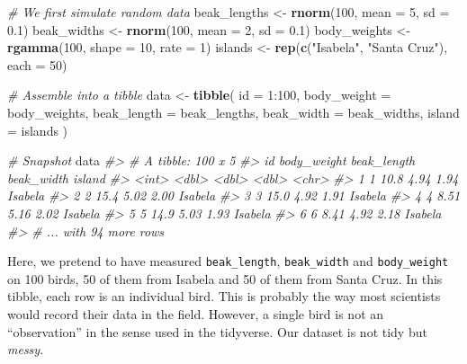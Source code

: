 \documentclass[]{book}
\newenvironment{Shaded}{}{}
\newcommand{\CommentTok}[1]{\textcolor[rgb]{0.38,0.63,0.69}{\textit{#1}}}
\newcommand{\DataTypeTok}[1]{\textcolor[rgb]{0.56,0.13,0.00}{#1}}
\newcommand{\DecValTok}[1]{\textcolor[rgb]{0.25,0.63,0.44}{#1}}
\newcommand{\FloatTok}[1]{\textcolor[rgb]{0.25,0.63,0.44}{#1}}
\newcommand{\KeywordTok}[1]{\textcolor[rgb]{0.00,0.44,0.13}{\textbf{#1}}}
\newcommand{\NormalTok}[1]{#1}
\newcommand{\OperatorTok}[1]{\textcolor[rgb]{0.40,0.40,0.40}{#1}}
\newcommand{\StringTok}[1]{\textcolor[rgb]{0.25,0.44,0.63}{#1}}
\begin{document}
\begin{Shaded}
\begin{Highlighting}[]
\CommentTok{# We first simulate random data}
\NormalTok{beak_lengths <-}\StringTok{ }\KeywordTok{rnorm}\NormalTok{(}\DecValTok{100}\NormalTok{, }\DataTypeTok{mean =} \DecValTok{5}\NormalTok{, }\DataTypeTok{sd =} \FloatTok{0.1}\NormalTok{)}
\NormalTok{beak_widths <-}\StringTok{ }\KeywordTok{rnorm}\NormalTok{(}\DecValTok{100}\NormalTok{, }\DataTypeTok{mean =} \DecValTok{2}\NormalTok{, }\DataTypeTok{sd =} \FloatTok{0.1}\NormalTok{)}
\NormalTok{body_weights <-}\StringTok{ }\KeywordTok{rgamma}\NormalTok{(}\DecValTok{100}\NormalTok{, }\DataTypeTok{shape =} \DecValTok{10}\NormalTok{, }\DataTypeTok{rate =} \DecValTok{1}\NormalTok{)}
\NormalTok{islands <-}\StringTok{ }\KeywordTok{rep}\NormalTok{(}\KeywordTok{c}\NormalTok{(}\StringTok{"Isabela"}\NormalTok{, }\StringTok{"Santa Cruz"}\NormalTok{), }\DataTypeTok{each =} \DecValTok{50}\NormalTok{)}

\CommentTok{# Assemble into a tibble}
\NormalTok{data <-}\StringTok{ }\KeywordTok{tibble}\NormalTok{(}
  \DataTypeTok{id =} \DecValTok{1}\OperatorTok{:}\DecValTok{100}\NormalTok{,}
  \DataTypeTok{body_weight =}\NormalTok{ body_weights,}
  \DataTypeTok{beak_length =}\NormalTok{ beak_lengths,}
  \DataTypeTok{beak_width =}\NormalTok{ beak_widths,}
  \DataTypeTok{island =}\NormalTok{ islands}
\NormalTok{)}

\CommentTok{# Snapshot}
\NormalTok{data}
\CommentTok{#> # A tibble: 100 x 5}
\CommentTok{#>      id body_weight beak_length beak_width island }
\CommentTok{#>   <int>       <dbl>       <dbl>      <dbl> <chr>  }
\CommentTok{#> 1     1       10.8         4.94       1.94 Isabela}
\CommentTok{#> 2     2       15.4         5.02       2.00 Isabela}
\CommentTok{#> 3     3       15.0         4.92       1.91 Isabela}
\CommentTok{#> 4     4        8.51        5.16       2.02 Isabela}
\CommentTok{#> 5     5       14.9         5.03       1.93 Isabela}
\CommentTok{#> 6     6        8.41        4.92       2.18 Isabela}
\CommentTok{#> # ... with 94 more rows}
\end{Highlighting}
\end{Shaded}

Here, we pretend to have measured \texttt{beak\_length}, \texttt{beak\_width} and \texttt{body\_weight} on 100 birds, 50 of them from Isabela and 50 of them from Santa Cruz. In this tibble, each row is an individual bird. This is probably the way most scientists would record their data in the field. However, a single bird is not an ``observation'' in the sense used in the tidyverse. Our dataset is not tidy but \emph{messy}.
\end{document}
